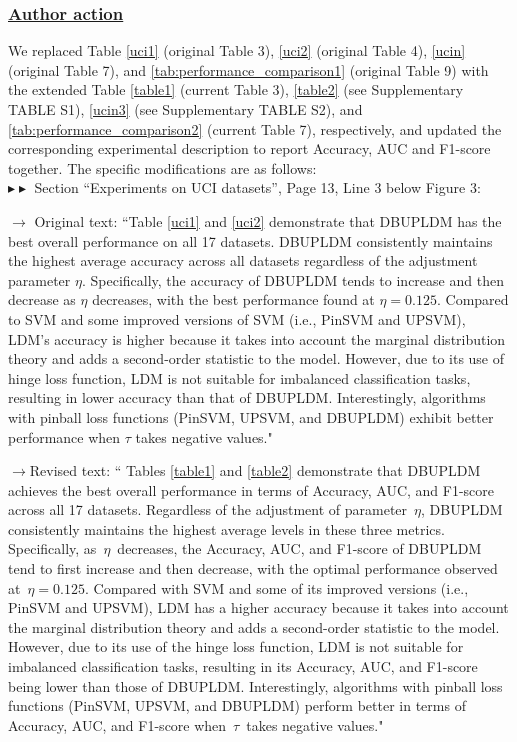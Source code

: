 \documentclass[journal,12pn, onecolumn]{IEEEtran}
\begin{document}
{{{\color{black}
\subsubsection*{\textbf{\underline{Author action }}}
We replaced Table \ref{uci1} (original Table 3), \ref{uci2} (original Table 4), \ref{ucin} (original Table 7), and \ref{tab:performance_comparison1} (original Table 9) with the extended Table \ref{table1} (current Table 3), \ref{table2} (see Supplementary TABLE S1), \ref{ucin3} (see Supplementary TABLE S2), and  \ref{tab:performance_comparison2} (current Table 7), respectively, and updated the corresponding experimental description to report Accuracy, AUC and F1-score together. The specific modifications are as follows: \\

$\blacktriangleright\blacktriangleright$ Section ``Experiments on UCI datasets'', Page 13,  Line 3 below Figure 3:\\
\par
{\color{black} $\longrightarrow$  Original  text: ``Table \ref{uci1} and \ref{uci2} demonstrate that DBUPLDM has the best overall performance on all 17 datasets. DBUPLDM consistently maintains the highest average accuracy across all datasets regardless of the adjustment parameter $\eta$. Specifically, the accuracy of DBUPLDM tends to increase and then decrease as $\eta$ decreases, with the best performance found at $\eta = 0.125$. Compared to SVM and some improved versions of SVM (i.e., PinSVM and UPSVM), LDM's accuracy is higher because it takes into account the marginal distribution theory and adds a second-order statistic to the model. However, due to its use of hinge loss function, LDM is not suitable for imbalanced classification tasks, resulting in lower accuracy than that of DBUPLDM. Interestingly, algorithms with pinball loss functions (PinSVM, UPSVM, and DBUPLDM) exhibit better performance when $\tau$ takes negative values."}\\
\par


{\color{orange}$\longrightarrow$Revised text: `` Tables \ref{table1} and \ref{table2} demonstrate that DBUPLDM achieves the best overall performance in terms of Accuracy, AUC, and F1-score across all 17 datasets. Regardless of the adjustment of parameter \(\eta\), DBUPLDM consistently maintains the highest average levels in these three metrics. Specifically, as \(\eta\) decreases, the Accuracy, AUC, and F1-score of DBUPLDM tend to first increase and then decrease, with the optimal performance observed at \(\eta = 0.125\). Compared with SVM and some of its improved versions (i.e., PinSVM and UPSVM), LDM has a higher accuracy because it takes into account the marginal distribution theory and adds a second-order statistic to the model. However, due to its use of the hinge loss function, LDM is not suitable for imbalanced classification tasks, resulting in its Accuracy, AUC, and F1-score being lower than those of DBUPLDM. Interestingly, algorithms with pinball loss functions (PinSVM, UPSVM, and DBUPLDM) perform better in terms of Accuracy, AUC, and F1-score when \(\tau\) takes negative values."}\\


}}}
\end{document}
